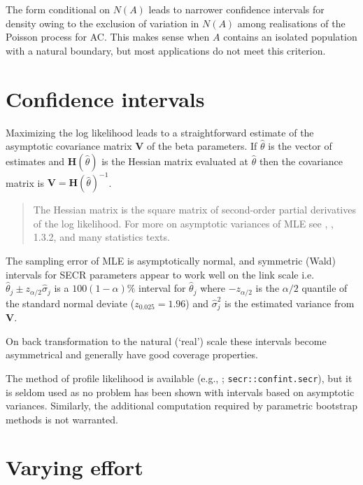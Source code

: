 \documentclass[
]{book}
\begin{document}
The form conditional on \(N(A)\) leads to narrower confidence intervals for density owing to the exclusion of variation in \(N(A)\) among realisations of the Poisson process for AC. This makes sense when \(A\) contains an isolated population with a natural boundary, but most applications do not meet this criterion.

\section{Confidence intervals}\label{confidenceintervals}


Maximizing the log likelihood leads to a straightforward estimate of the asymptotic covariance matrix \(\mathbf{V}\) of the beta parameters. If \(\hat \theta\) is the vector of estimates and \(\mathbf{H}(\hat \theta)\) is the Hessian matrix evaluated at \(\hat \theta\) then the covariance matrix is \(\mathbf{V} = \mathbf{H}(\hat \theta)^{-1}\).

\begin{quote}
The Hessian matrix is the square matrix of second-order partial derivatives of the log likelihood. For more on asymptotic variances of MLE see \citet{s82}, \citet{Borchers2002}, \citet{cw} 1.3.2, and many statistics texts.
\end{quote}

The sampling error of MLE is asymptotically normal, and symmetric (Wald) intervals for SECR parameters appear to work well on the link scale i.e.~\(\hat \theta_j \pm z_{\alpha/2} \hat \sigma_j\) is a \(100(1-\alpha)\%\) interval for \(\hat \theta_j\) where \(-z_{\alpha/2}\) is the \(\alpha/2\) quantile of the standard normal deviate (\(z_{0.025} = 1.96\)) and \(\hat \sigma_j^2\) is the estimated variance from \(\mathbf{V}\).

On back transformation to the natural (`real') scale these intervals become asymmetrical and generally have good coverage properties.

The method of profile likelihood is available (e.g., \citet{Evans1996}; \texttt{secr::confint.secr}), but it is seldom used as no problem has been shown with intervals based on asymptotic variances. Similarly, the additional computation required by parametric bootstrap methods is not warranted.

\section{Varying effort}\label{varying-effort}
\end{document}
